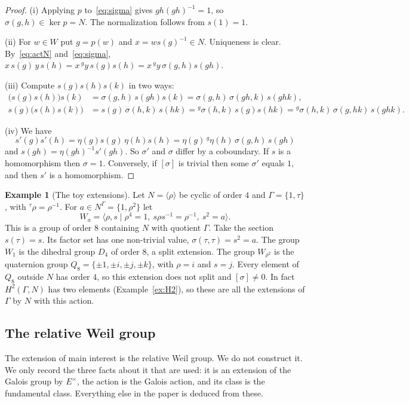 \documentclass[12pt,letterpaper]{article}
\numberwithin{equation}{section}
\theoremstyle{plain}
\theoremstyle{definition}
\newtheorem{example}[theorem]{Example}
\newcommand{\act}[2]{{}^{#1}\!#2}          %
\begin{document}
\begin{proof}
(i) Applying $p$ to~\eqref{eq:sigma} gives $gh(gh)^{-1}=1$, so
$\sigma(g,h)\in\ker p=N$. The normalization follows from $s(1)=1$.

(ii) For $w\in W$ put $g=p(w)$ and $x=ws(g)^{-1}\in N$. Uniqueness is
clear. By~\eqref{eq:actN} and~\eqref{eq:sigma},
$x\,s(g)\,y\,s(h)=x\,\act{g}{y}\,s(g)s(h)=x\,\act{g}{y}\,\sigma(g,h)s(gh)$.

(iii) Compute $s(g)s(h)s(k)$ in two ways:
\begin{align*}
\bigl(s(g)s(h)\bigr)s(k)&=\sigma(g,h)\,s(gh)s(k)=\sigma(g,h)\,\sigma(gh,k)\,s(ghk),\\
s(g)\bigl(s(h)s(k)\bigr)&=s(g)\,\sigma(h,k)\,s(hk)
=\act{g}{\sigma(h,k)}\,s(g)s(hk)=\act{g}{\sigma(h,k)}\,\sigma(g,hk)\,s(ghk).
\end{align*}

(iv) We have
\[
s'(g)s'(h)=\eta(g)s(g)\,\eta(h)s(h)
=\eta(g)\,\act{g}{\eta(h)}\,\sigma(g,h)\,s(gh)
\]
and $s(gh)=\eta(gh)^{-1}s'(gh)$. So $\sigma'$ and $\sigma$ differ by a
coboundary. If $s$ is a homomorphism then $\sigma=1$. Conversely, if
$[\sigma]$ is trivial then some $\sigma'$ equals $1$, and then $s'$ is a
homomorphism.
\end{proof}

\begin{example}[The toy extensions]\label{ex:toy}
Let $N=\langle\rho\rangle$ be cyclic of order $4$ and $\Gamma=\{1,\tau\}$,
with $\act{\tau}{\rho}=\rho^{-1}$. For $a\in N^\Gamma=\{1,\rho^2\}$ let
\[
W_a=\langle \rho, s \mid \rho^4=1,\ s\rho s^{-1}=\rho^{-1},\ s^2=a\rangle .
\]
This is a group of order $8$ containing $N$ with quotient $\Gamma$. Take
the section $s(\tau)=s$. Its factor set has one non-trivial value,
$\sigma(\tau,\tau)=s^2=a$. The group $W_1$ is the dihedral group $D_4$ of
order $8$, a split extension. The group $W_{\rho^2}$ is the quaternion
group $Q_8=\{\pm1,\pm i,\pm j,\pm k\}$, with $\rho=i$ and $s=j$. Every
element of $Q_8$ outside $N$ has order $4$, so this extension does not
split and $[\sigma]\neq0$. In fact $H^2(\Gamma,N)$ has two elements
(Example~\ref{ex:H2}), so these are all the extensions of $\Gamma$ by $N$
with this action.
\end{example}

\subsection{The relative Weil group}\label{ss:weil}

The extension of main interest is the relative Weil group. We do not
construct it. We only record the three facts about it that are used: it
is an extension of the Galois group by $E^\times$, the action is the
Galois action, and its class is the fundamental class. Everything else in
the paper is deduced from these.
\end{document}
